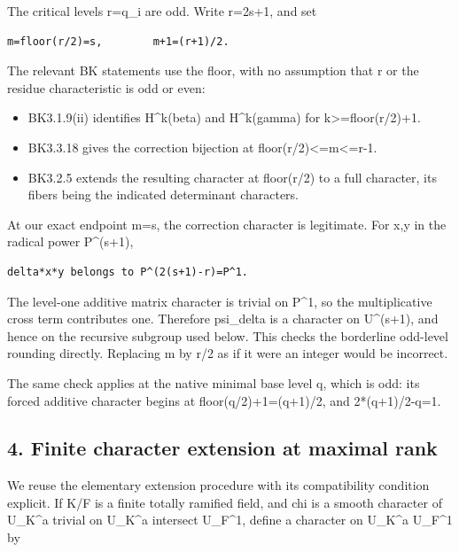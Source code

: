 The critical levels r=q\_i are odd. Write r=2s+1, and set

\begin{Verbatim}[fontsize=\small,breaklines=true,breakanywhere=true]
m=floor(r/2)=s,        m+1=(r+1)/2.
\end{Verbatim}

The relevant BK statements use the floor, with no assumption that r or
the residue characteristic is odd or even:

\begin{itemize}
\tightlist
\item
  BK3.1.9(ii) identifies H\^{}k(beta) and H\^{}k(gamma) for
  k\textgreater=floor(r/2)+1.
\item
  BK3.3.18 gives the correction bijection at
  floor(r/2)\textless=m\textless=r-1.
\item
  BK3.2.5 extends the resulting character at floor(r/2) to a full
  character, its fibers being the indicated determinant characters.
\end{itemize}

At our exact endpoint m=s, the correction character is legitimate. For
x,y in the radical power P\^{}(s+1),

\begin{Verbatim}[fontsize=\small,breaklines=true,breakanywhere=true]
delta*x*y belongs to P^(2(s+1)-r)=P^1.
\end{Verbatim}

The level-one additive matrix character is trivial on P\^{}1, so the
multiplicative cross term contributes one. Therefore psi\_delta is a
character on U\^{}(s+1), and hence on the recursive subgroup used below.
This checks the borderline odd-level rounding directly. Replacing m by
r/2 as if it were an integer would be incorrect.

The same check applies at the native minimal base level q, which is odd:
its forced additive character begins at floor(q/2)+1=(q+1)/2, and
2*(q+1)/2-q=1.

\hypertarget{dyadic_character-finite-character-extension-at-maximal-rank}{%
\subsection{4. Finite character extension at maximal
rank}\label{dyadic_character-finite-character-extension-at-maximal-rank}}

We reuse the elementary extension procedure with its compatibility
condition explicit. If K/F is a finite totally ramified field, and chi
is a smooth character of U\_K\^{}a trivial on U\_K\^{}a intersect
U\_F\^{}1, define a character on U\_K\^{}a U\_F\^{}1 by

